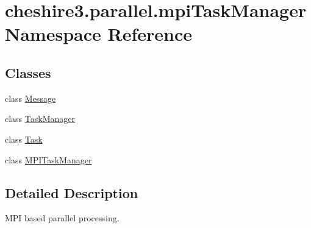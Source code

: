 \hypertarget{namespacecheshire3_1_1parallel_1_1mpi_task_manager}{\section{cheshire3.\-parallel.\-mpi\-Task\-Manager Namespace Reference}
\label{namespacecheshire3_1_1parallel_1_1mpi_task_manager}
}
\subsection*{Classes}
\begin{DoxyCompactItemize}
\item 
class \hyperlink{classcheshire3_1_1parallel_1_1mpi_task_manager_1_1_message}{Message}
\item 
class \hyperlink{classcheshire3_1_1parallel_1_1mpi_task_manager_1_1_task_manager}{Task\-Manager}
\item 
class \hyperlink{classcheshire3_1_1parallel_1_1mpi_task_manager_1_1_task}{Task}
\item 
class \hyperlink{classcheshire3_1_1parallel_1_1mpi_task_manager_1_1_m_p_i_task_manager}{M\-P\-I\-Task\-Manager}
\end{DoxyCompactItemize}


\subsection{Detailed Description}
\begin{DoxyVerb}MPI based parallel processing.\end{DoxyVerb}
 
